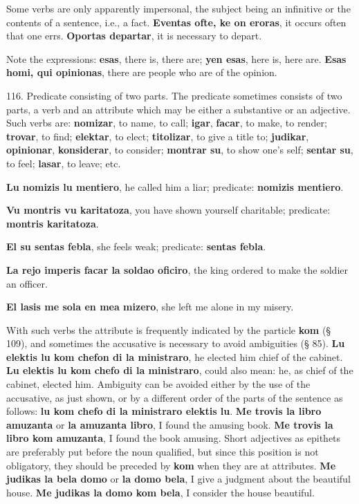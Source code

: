 Some verbs are only apparently impersonal, the subject being an infinitive or the contents of a sentence, i.e., a fact. \textbf{Eventas ofte, ke on eroras}, it occurs often that one errs. \textbf{Oportas departar}, it is necessary to depart.

Note the expressions: \textbf{esas}, there is, there are;\textbf{ yen esas}, here is, here are. \textbf{Esas homi, qui opinionas}, there are people who are of the opinion.

116. Predicate consisting of two parts. The predicate sometimes consists of two parts, a verb and an attribute which may be either a substantive or an adjective. Such verbs are: \textbf{nomizar}, to name, to call; \textbf{igar}, \textbf{facar}, to make, to render; \textbf{trovar}, to find; \textbf{elektar}, to elect; \textbf{titolizar}, to give a title to; \textbf{judikar}, \textbf{opinionar}, \textbf{konsiderar}, to consider; \textbf{montrar su}, to show one's self; \textbf{sentar su}, to feel; \textbf{lasar}, to leave; etc.

\textbf{Lu nomizis lu mentiero}, he called him a liar; predicate: \textbf{nomizis mentiero}.

\textbf{Vu montris vu karitatoza}, you have shown yourself charitable; predicate: \textbf{montris karitatoza}.

\textbf{El su sentas febla}, she feels weak; predicate: \textbf{sentas febla}.

\textbf{La rejo imperis facar la soldao oficiro}, the king ordered to make the soldier an officer.

\textbf{El lasis me sola en mea mizero}, she left me alone in my misery.

With such verbs the attribute is frequently indicated by the particle \textbf{kom} (§ 109), and sometimes the accusative is necessary to avoid ambiguities (§ 85). \textbf{Lu elektis lu kom chefon di la ministraro}, he elected him chief of the cabinet. \textbf{Lu elektis lu kom chefo di la ministraro}, could also mean: he, as chief of the cabinet, elected him. Ambiguity can be avoided either by the use of the accusative, as just shown, or by a different order of the parts of the sentence as follows: \textbf{lu kom chefo di la ministraro elektis lu}. \textbf{Me trovis la libro amuzanta} or \textbf{la amuzanta libro}, I found the amusing book. \textbf{Me trovis la libro kom amuzanta}, I found the book amusing. Short adjectives as epithets are preferably put before the noun qualified, but since this position is not obligatory, they should be preceded by \textbf{kom} when they are at attributes. \textbf{Me judikas la bela domo} or \textbf{la domo bela}, I give a judgment about the beautiful house. \textbf{Me judikas la domo kom bela}, I consider the house beautiful.

